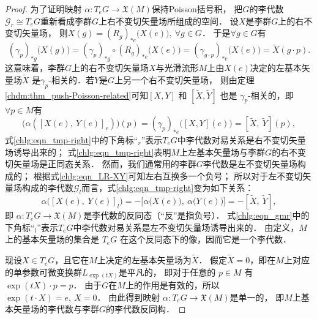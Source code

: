 \begin{proof}
    
    为了证明映射 $\alpha: T_e G \rightarrow \mathfrak{X}(M)$保持Poisson括号积，
    把$G$的李代数$\mathscr{G}_r\cong T_e G$重新看成李群$G$上右不变切矢量场所组成的空间．
    设$X$是李群$G$上的右不变切矢量场，
    则$X(g)= (R_g)_{*e}\bigl(X(e)\bigr), \ \forall g \in G $．
    于是$\forall g \in G$有
    \begin{equation*}
        (\gamma_p)_{* g}\bigl(X(g)\bigr) = (\gamma_p)_{* g} \circ (R_g)_{* e}\bigl(X(e)\bigr) 
        =(\gamma_{g\cdot p})_{* e}\bigl(X(e)\bigr)  =\widetilde{X}(g \cdot p) .
    \end{equation*}
    这意味着，李群$G$上的右不变切矢量场$X$与光滑流形$M$上由$X(e)$决定的左基本矢量场$\widetilde{X}$
    是$\gamma_{p}$-相关的．若$Y$是$G$上另一个右不变切矢量场，
    则由定理\ref{chdm:thm_push-Poisson-related}可知$[X, Y]$ 和 $[\widetilde{X}, \widetilde{Y}]$
    也是 $\gamma_{p}$-相关的，即$\forall p \in M$有
    \begin{equation}\label{chlg:eqn_tmp-right}
        \bigl(\alpha\left([X(e),\ Y(e)]_r\right)\bigr)(p)
        =(\gamma_p)_{*e}\bigl([X, Y](e)\bigr)
        =[\widetilde{X},\ \widetilde{Y}](p),
    \end{equation}
    式\eqref{chlg:eqn_tmp-right}中的下角标“${}_r$”表示$T_e G$中李代数对易关系是{\heiti 右}不变切矢量场诱导出来的；
    式\eqref{chlg:eqn_tmp-right}表明$M$上左基本矢量场与李群$G$的右不变切矢量场是{\heiti 正同态}关系．
    然而，我们通常用的李群$G$李代数是左不变切矢量场构成的；
    根据式\eqref{chlg:eqn_LR-XY}可知左右互换多一个负号；
    所以对于左不变切矢量场构成的李代数$\mathscr{G}_l$而言，式\eqref{chlg:eqn_tmp-right}变为如下关系：
    \begin{equation}\label{chlg:eqn_gmr}
        \alpha\bigl([X(e),\ Y(e)]_l\bigr)=-\bigl[\alpha\bigl(X(e)\bigr),\ \alpha\bigl(Y(e)\bigr)\bigr]
        =-[\widetilde{X},\ \widetilde{Y}],
    \end{equation}
    即 $\alpha: T_e G \rightarrow \mathfrak{X}(M)$是李代数的{\heiti 反同态}（“反”是指负号）．
    式\eqref{chlg:eqn_gmr}中的下角标“${}_l$”表示$T_e G$中李代数对易关系是{\heiti 左}不变切矢量场诱导出来的．
    由定义，$M$上的基本矢量场的集合是 $T_e G$ 在这个反同态下的像，因而它是一个李代数．
    
    现设$X \in T_e G$，且它在$M$上决定的左基本矢量场为$\widetilde{X}$．
    假定$\widetilde{X}=0$，即在$M$上对应的单参数可微变换群$L_{\exp (t X)}$是平凡的，
    即对于任意的 $p \in M$ 有$ \exp (t  X)\cdot p=p$．
    由于$G$在$M$上的作用是有效的，所以
    $ \exp (t \cdot X)=e, \ X=0 $．
    由此得到映射 $\alpha: T_{e} G \rightarrow \mathfrak{X}(M)$是单一的，
    即$M$上基本矢量场的李代数与李群$G$的李代数反同构．
\end{proof}

